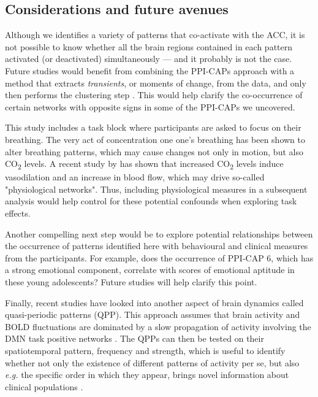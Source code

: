 \subsection*{Considerations and future avenues}

Although we identifies a variety of patterns that co-activate with the ACC, it is not possible to know whether all the brain regions contained in each pattern activated (or deactivated) simultaneously --- and it probably is not the case. Future studies would benefit from combining the PPI-CAPs approach with a method that extracts \textit{transients}, or moments of change, from the data, and only then performs the clustering step \citep{Karahanoglu2015a,Freitas2020}. This would help clarify the co-occurrence of certain networks with opposite signs in some of the PPI-CAPs we uncovered. 

This study includes a task block where participants are asked to focus on their breathing. The very act of concentration one one's breathing has been shown to alter breathing patterns, which may cause changes not only in motion, but also CO\textsubscript{2} levels. A recent study by \citet{Chen2020} has shown that increased CO\textsubscript{2} levels induce vasodilation and an increase in blood flow, which may drive so-called "physiological networks". Thus, including physiological measures in a subsequent analysis would help control for these potential confounds when exploring task effects.


Another compelling next step would be to explore potential relationships between the occurrence of patterns identified here with behavioural and clinical measures from the participants. For example, does the occurrence of PPI-CAP 6, which has a strong emotional component, correlate with scores of emotional aptitude in these young adolescents? Future studies will help clarify this point.

Finally, recent studies have looked into another aspect of brain dynamics called quasi-periodic patterns (QPP)\citep{Majeed2011}. This approach assumes that brain activity and BOLD fluctuations are dominated by a slow propagation of activity involving the DMN task positive networks \citep{Abbas2019}. The QPPs can then be tested on their spatiotemporal pattern, frequency and strength, which is useful to identify whether not only the existence of different patterns of activity per se, but also \textit{e.g.} the specific order in which they appear, brings novel information about clinical populations \citep{Briend2020}.


